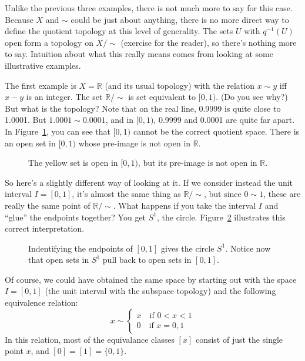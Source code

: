 \documentclass[12pt]{article}
\begin{document}
Unlike the previous three examples, there is not much more to say for this case. Because $X$ and $\sim$ could be just about anything, there is no more direct way to define the quotient topology at this level of generality. The sets $U$ with $q^{-1}(U)$ open form a topology on $X/\!\sim$ (exercise for the reader), so there's nothing more to say. Intuition about what this really means comes from looking at some illustrative examples.

The first example is $X = \mathbb{R}$ (and its usual topology) with the relation $x \sim y$ iff $x - y$ is an integer. The set $\mathbb{R}/\!\sim$ is set equivalent to $[0,1)$. (Do you see why?) But what is the topology? Note that on the real line, 0.9999 is quite close to 1.0001. But $1.0001 \sim 0.0001$, and in $[0,1)$, 0.9999 and 0.0001 are quite far apart. In Figure~\ref{F:real_line_0_1}, you can see that $[0,1)$ cannot be the correct quotient space. There is an open set in $[0,1)$ whose pre-image is not open in $\mathbb{R}$.

\begin{figure}[ht]
\centering

\caption{The yellow set is open in $[0,1)$, but its pre-image is not open in $\mathbb{R}$.}
\label{F:real_line_0_1}
\end{figure}

So here's a slightly different way of looking at it. If we consider instead the unit interval $I = [0,1]$, it's almost the same thing as $\mathbb{R}/\!\sim$, but since $0 \sim 1$, these are really the same point of $\mathbb{R}/\!\sim$. What happens if you take the interval $I$ and ``glue'' the endpoints together? You get $S^{1}$, the circle. Figure~\ref{F:0_1_circle} illustrates this correct interpretation.

\begin{figure}[ht]
\centering

\caption{Indentifying the endpoints of $[0,1]$ gives the circle $S^{1}$. Notice now that open sets in $S^{1}$ pull back to open sets in $[0,1]$.}
\label{F:0_1_circle}
\end{figure}

Of course, we could have obtained the same space by starting out with the space $I = [0,1]$ (the unit interval with the subspace topology) and the following equivalence relation:
\[
	x \sim
    \begin{cases}
    	x \quad \text{if } 0 < x < 1 \\
        0 \quad \text{if } x = 0, 1
    \end{cases}
\]
In this relation, most of the equivalance classes $[x]$ consist of just the single point $x$, and $[0] = [1] = \{0, 1\}$.
\end{document}
